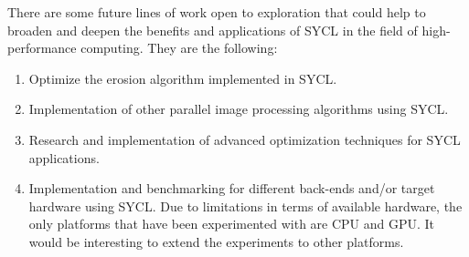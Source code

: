 There are some future lines of work open to exploration that could help to broaden and deepen the benefits and applications of SYCL in the field of high-performance computing.
They are the following:

 \begin{enumerate}
     \item Optimize the erosion algorithm implemented in SYCL.
     \item Implementation of other parallel image processing algorithms using SYCL.
     \item Research and implementation of advanced optimization techniques for SYCL applications.
     \item Implementation and benchmarking for different back-ends and/or target hardware using SYCL. Due to limitations in terms of available hardware, the only platforms that have been experimented with are CPU and GPU. It would be interesting to extend the experiments to other platforms.
 \end{enumerate}




